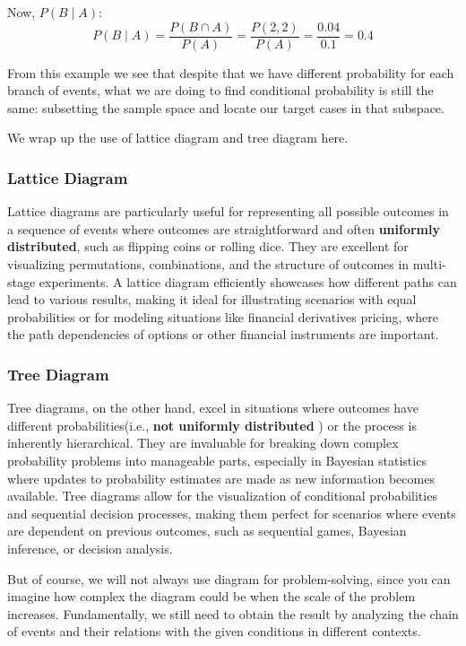 \begin{solution}
\begin{remark}
    \end{remark}
    Now, \( P(B \mid A) \):
    \[ P(B \mid A) = \frac{P(B \cap A)}{P(A)} = \frac{P(2, 2)}{P(A)} = \frac{0.04}{0.1} = 0.4 \]
    
 From this example we see that despite that we have different probability for each branch of events, what we are doing to find conditional probability is still the same:
 subsetting the sample space and locate our target cases in that subspace.
\end{solution}

We wrap up the use of lattice diagram and tree diagram here.
    \subsubsection*{Lattice Diagram}
    Lattice diagrams are particularly useful for representing all possible outcomes in a sequence of events where outcomes are straightforward and often \textbf{uniformly distributed}, such as 
    flipping coins or rolling dice. They are excellent for visualizing permutations, combinations, and the structure of outcomes in multi-stage experiments. A lattice diagram efficiently showcases how different
    paths can lead to various results, making it ideal for illustrating scenarios with equal probabilities or for modeling situations like financial derivatives pricing, where the path dependencies of 
    options or other financial instruments are important.
    \subsubsection*{Tree Diagram}
    Tree diagrams, on the other hand, excel in situations where outcomes have different probabilities(i.e., \textbf{not uniformly distributed} ) or the process is inherently hierarchical. They are invaluable for breaking down complex probability problems into 
    manageable parts, especially in Bayesian statistics where updates to probability estimates are made as new information becomes available. Tree diagrams allow for the visualization of conditional probabilities 
    and sequential decision processes, making them perfect for scenarios where events are dependent on previous outcomes, such as sequential games, Bayesian inference, or decision analysis.

    But of course, we will not always use diagram for problem-solving, since you can imagine how complex the diagram could be when the scale of the problem increases. Fundamentally,
    we still need to obtain the result by analyzing the chain of events and their relations with the given conditions in different contexts.

